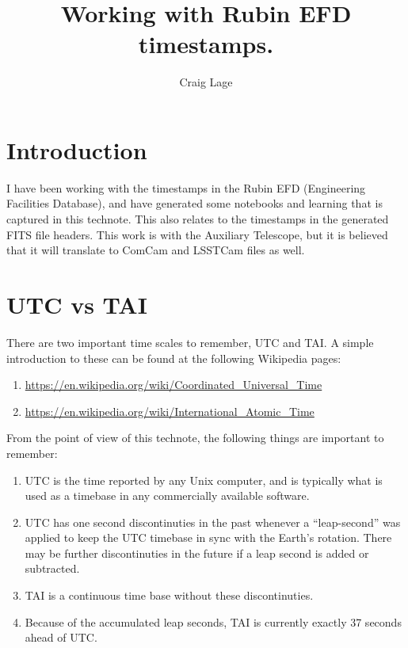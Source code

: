 \documentclass[SE,authoryear,toc]{lsstdoc}
\title{Working with Rubin EFD timestamps.}
\author{%
Craig Lage
}
\date{\vcsDate}
\begin{document}
\maketitle


\section{Introduction}

I have been working with the timestamps in the Rubin EFD (Engineering Facilities Database), and have generated some notebooks and learning that is captured in this technote.  This also relates to the timestamps in the generated FITS file headers.  This work is with the Auxiliary Telescope, but it is believed that it will translate to ComCam and LSSTCam files as well.

\section{UTC vs TAI}

There are two important time scales to remember, UTC and TAI.  A simple introduction to these can be found at the following Wikipedia pages:
\begin{enumerate}
  \item \url{https://en.wikipedia.org/wiki/Coordinated_Universal_Time}
  \item \url{https://en.wikipedia.org/wiki/International_Atomic_Time}
\end{enumerate}

From the point of view of this technote, the following things are important to remember:
\begin{enumerate}
  \item UTC is the time reported by any Unix computer, and is typically what is used as a timebase in any commercially available software.
  \item UTC has one second discontinuties in the past whenever a ``leap-second'' was applied to keep the UTC timebase in sync with the Earth's rotation.  There may be further discontinuties in the future if a leap second is added or subtracted.
  \item TAI is a continuous time base without these discontinuties.
  \item Because of the accumulated leap seconds, TAI is currently exactly 37 seconds ahead of UTC.  
\end{enumerate}
\end{document}
